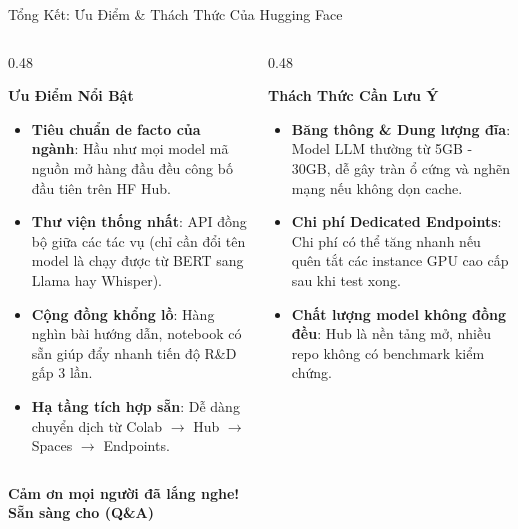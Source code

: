 \documentclass[aspectratio=169, 10pt]{beamer}
\begin{document}
\begin{frame}{Tổng Kết: Ưu Điểm \& Thách Thức Của Hugging Face}
\begin{columns}[T]
  \begin{column}{0.48\textwidth}
    \begin{block}{\textbf{\textcolor{hfgreen}{} Ưu Điểm Nổi Bật}}
      \begin{itemize}
        \item \textbf{Tiêu chuẩn de facto của ngành}: Hầu như mọi model mã nguồn mở hàng đầu đều công bố đầu tiên trên HF Hub.
        \item \textbf{Thư viện thống nhất}: API đồng bộ giữa các tác vụ (chỉ cần đổi tên model là chạy được từ BERT sang Llama hay Whisper).
        \item \textbf{Cộng đồng khổng lồ}: Hàng nghìn bài hướng dẫn, notebook có sẵn giúp đẩy nhanh tiến độ R\&D gấp 3 lần.
        \item \textbf{Hạ tầng tích hợp sẵn}: Dễ dàng chuyển dịch từ Colab $\rightarrow$ Hub $\rightarrow$ Spaces $\rightarrow$ Endpoints.
      \end{itemize}
    \end{block}
  \end{column}

  \begin{column}{0.48\textwidth}
    \begin{alertblock}{\textbf{\textcolor{hfred}{} Thách Thức Cần Lưu Ý}}
      \begin{itemize}
        \item \textbf{Băng thông \& Dung lượng đĩa}: Model LLM thường từ 5GB - 30GB, dễ gây tràn ổ cứng và nghẽn mạng nếu không dọn cache.
        \item \textbf{Chi phí Dedicated Endpoints}: Chi phí có thể tăng nhanh nếu quên tắt các instance GPU cao cấp sau khi test xong.
        \item \textbf{Chất lượng model không đồng đều}: Hub là nền tảng mở, nhiều repo không có benchmark kiểm chứng.
      \end{itemize}
    \end{alertblock}
  \end{column}
\end{columns}
\end{frame}

\begin{frame}{}
\vspace{1.2em}
\begin{center}
  \Large \textbf{\textcolor{hfprimary}{Cảm ơn mọi người đã lắng nghe!}}\\[4pt]
  \normalsize \textbf{\textcolor{hforange}{Sẵn sàng cho (Q\&A)}}
\end{center}
\end{frame}
\end{document}
